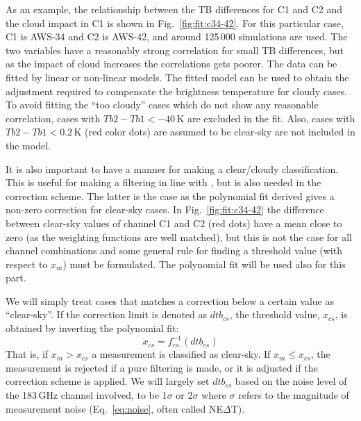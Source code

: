 \documentclass[12pt]{article}
\begin{document}
As an example, the relationship between the TB differences for C1 and C2 and
the cloud impact in C1 is shown in Fig.~\ref{fig:fit:c34-42}. For this
particular case, C1 is AWS-34 and C2 is AWS-42, and around 125\,000 simulations
are used. The two variables have a reasonably strong correlation for small TB
differences, but as the impact of cloud increases the correlations gets poorer.
The data can be fitted by linear or non-linear models. The fitted model can be
used to obtain the adjustment required to compensate the brightness
temperature for cloudy cases. To avoid fitting the ``too cloudy'' cases which
do not show any reasonable correlation, cases with $Tb2-Tb1< -40$\,K are
excluded in the fit. Also, cases with $Tb2-Tb1 < 0.2$\,K (red color dots) are
assumed to be clear-sky are not included in the model.

It is also important to have a manner for making a clear/cloudy classification.
This is useful for making a filtering in line with \citet{rekha2012potential},
but is also needed in the correction scheme. The latter is the case as the
polynomial fit derived gives a non-zero correction for clear-sky cases. In
Fig.~\ref{fig:fit:c34-42} the difference between clear-sky values of channel C1
and C2 (red dots) have a mean close to zero (as the weighting functions are
well matched), but this is not the case for all channel combinations and some
general rule for finding a threshold value (with respect to $x_m$) must be
formulated. The polynomial fit will be used also for this part.


We will simply treat cases that matches a correction below a certain value as
``clear-sky''. If the correction limit is denoted as $dtb_{cs}$, the threshold
value, $x_{cs}$, is obtained by inverting the polynomial fit:
\begin{equation}
x_{cs} = f_{cs}^{-1}(dtb_{cs}) 
\label{eq:dtb}
\end{equation}
That is, if $x_m>x_{cs}$ a measurement is classified as clear-sky. If
$x_m\leq x_{cs}$, the measurement is rejected if a pure filtering is made, or
it is adjusted if the correction scheme is applied. We will largely set
$dtb_{cs}$ based on the noise level of the 183\,GHz channel involved, to be
1$\sigma$ or 2$\sigma$ where $\sigma$ refers to the magnitude of measurement
noise (Eq.~\ref{eq:noise}, often called NE$\Delta$T).
\end{document}
